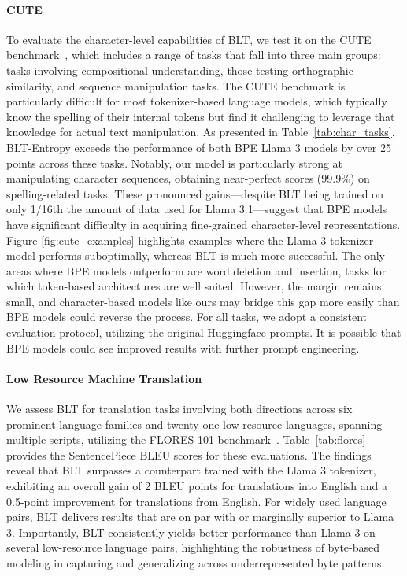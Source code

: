\paragraph{CUTE}
To evaluate the character-level capabilities of {\textsc BLT}, we test it on the CUTE benchmark~\citep{edman2024cute}, which includes a range of tasks that fall into three main groups: tasks involving compositional understanding, those testing orthographic similarity, and sequence manipulation tasks. The CUTE benchmark is particularly difficult for most tokenizer-based language models, which typically know the spelling of their internal tokens but find it challenging to leverage that knowledge for actual text manipulation. As presented in Table~\ref{tab:char_tasks}, {\textsc BLT}-Entropy exceeds the performance of both BPE Llama 3 models by over 25 points across these tasks. Notably, our model is particularly strong at manipulating character sequences, obtaining near-perfect scores (99.9\%) on spelling-related tasks. These pronounced gains—despite {\textsc BLT} being trained on only 1/16th the amount of data used for Llama 3.1—suggest that BPE models have significant difficulty in acquiring fine-grained character-level representations. Figure \ref{fig:cute_examples} highlights examples where the Llama 3 tokenizer model performs suboptimally, whereas {\textsc BLT} is much more successful. The only areas where BPE models outperform are word deletion and insertion, tasks for which token-based architectures are well suited. However, the margin remains small, and character-based models like ours may bridge this gap more easily than BPE models could reverse the process. For all tasks, we adopt a consistent evaluation protocol, utilizing the original Huggingface prompts. It is possible that BPE models could see improved results with further prompt engineering.

\paragraph{Low Resource Machine Translation} We assess {\textsc BLT} for translation tasks involving both directions across six prominent language families and twenty-one low-resource languages, spanning multiple scripts, utilizing the FLORES-101 benchmark~\citep{goyal2022flores}. Table~\ref{tab:flores} provides the SentencePiece BLEU scores for these evaluations. The findings reveal that {\textsc BLT} surpasses a counterpart trained with the Llama 3 tokenizer, exhibiting an overall gain of 2 BLEU points for translations into English and a 0.5-point improvement for translations from English. For widely used language pairs, {\textsc BLT} delivers results that are on par with or marginally superior to Llama 3. Importantly, {\textsc BLT} consistently yields better performance than Llama 3 on several low-resource language pairs, highlighting the robustness of byte-based modeling in capturing and generalizing across underrepresented byte patterns.


